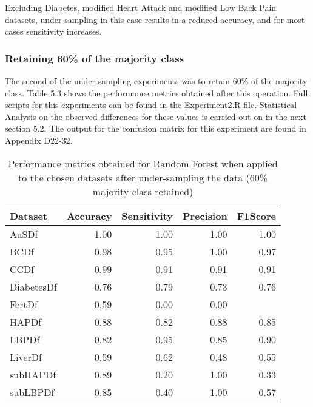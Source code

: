 Excluding Diabetes, modified Heart Attack and modified Low Back Pain datasets, under-sampling in this case results in a reduced accuracy, and for most cases sensitivity increases. 


\subsubsection{Retaining 60\% of the majority class}
The second of the under-sampling experiments was to retain 60\% of the majority class. Table 5.3 shows the performance metrics obtained after this operation. Full scripts for this experiments can be found in the Experiment2.R file.
Statistical Analysis on the observed differences for these values is carried out on in the next section 5.2.
The output for the confusion matrix for this experiment are found in Appendix D22-32.

\begin{table}[ht]
\centering
\begin{tabular}{lrrrr}
  \hline
  \rowcolor{LightCyan}
Dataset & Accuracy & Sensitivity & Precision & F1Score \\ 
  \hline
AuSDf & 1.00 & 1.00 & 1.00 & 1.00 \\ 
  BCDf & 0.98 & 0.95 & 1.00 & 0.97 \\ 
  CCDf & 0.99 & 0.91 & 0.91 & 0.91 \\ 
  DiabetesDf & 0.76 & 0.79 & 0.73 & 0.76 \\ 
  FertDf & 0.59 & 0.00 & 0.00 &  \\ 
  HAPDf & 0.88 & 0.82 & 0.88 & 0.85 \\ 
  LBPDf & 0.82 & 0.95 & 0.85 & 0.90 \\ 
  LiverDf & 0.59 & 0.62 & 0.48 & 0.55 \\ 
  subHAPDf & 0.89 & 0.20 & 1.00 & 0.33 \\ 
  subLBPDf & 0.85 & 0.40 & 1.00 & 0.57 \\ 
   \hline
\end{tabular}
\caption{Performance metrics obtained for Random Forest when applied to the chosen datasets after under-sampling the data (60\% majority class retained)}
\end{table}

